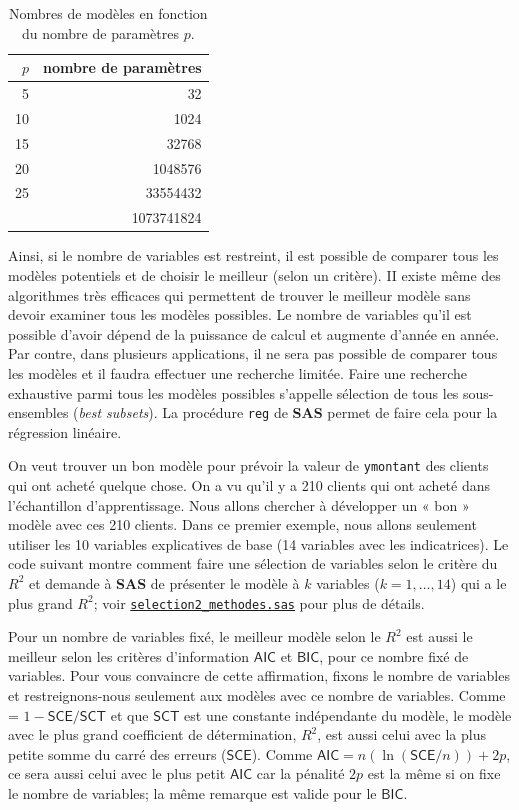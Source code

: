 \documentclass[
  11pt,
  letterpaper,
]{book}
\theoremstyle{definition}
\theoremstyle{definition}
\theoremstyle{definition}
\theoremstyle{definition}
\theoremstyle{remark}
\begin{document}
\begin{table}

\caption{\label{tab:02-table3}Nombres de modèles en fonction du nombre de paramètres $p$.}
\centering
\begin{tabular}[t]{rr}
\toprule
$p$ & nombre de paramètres\\
\midrule
5 & 32\\
10 & 1024\\
15 & 32768\\
20 & 1048576\\
25 & 33554432\\
\addlinespace
30 & 1073741824\\
\bottomrule
\end{tabular}
\end{table}

Ainsi, si le nombre de variables est restreint, il est possible de comparer tous les modèles potentiels et de choisir le meilleur (selon un critère). II existe même des algorithmes très efficaces qui permettent de trouver le meilleur modèle sans devoir examiner tous les modèles possibles. Le nombre de variables qu'il est possible d'avoir dépend de la puissance de calcul et augmente d'année en année. Par contre, dans plusieurs applications, il ne sera pas possible de comparer tous les modèles et il faudra effectuer une recherche limitée. Faire une recherche exhaustive parmi tous les modèles possibles s'appelle sélection de tous les sous-ensembles (\emph{best subsets}). La procédure \texttt{reg} de \textbf{SAS} permet de faire cela pour la régression linéaire.

On veut trouver un bon modèle pour prévoir la valeur de \texttt{ymontant} des clients qui ont acheté quelque chose. On a vu qu'il y a 210 clients qui ont acheté dans l'échantillon d'apprentissage. Nous allons chercher à développer un « bon » modèle avec ces 210 clients. Dans ce premier exemple, nous allons seulement utiliser les 10 variables explicatives de base (14 variables avec les indicatrices). Le code suivant montre comment faire une sélection de variables selon le critère du \(R^2\) et demande à \textbf{SAS} de présenter le modèle à \(k\) variables (\(k=1, \ldots, 14\)) qui a le plus grand \(R^2\); voir \href{https://raw.githubusercontent.com/lbelzile/math60602/master/documents/codeSAS/selection2_methodes.sas}{\texttt{selection2\_methodes.sas}} pour plus de détails.

Pour un nombre de variables fixé, le meilleur modèle selon le \(R^2\) est aussi le meilleur selon les critères d'information \(\mathsf{AIC}\) et \(\mathsf{BIC}\), pour ce nombre fixé de variables. Pour vous convaincre de cette affirmation, fixons le nombre de variables et restreignons-nous seulement aux modèles avec ce nombre de variables. Comme = \(1 - \mathsf{SCE}/\mathsf{SCT}\) et que \(\mathsf{SCT}\) est une constante indépendante du modèle, le modèle avec le plus grand coefficient de détermination, \(R^2\), est aussi celui avec la plus petite somme du carré des erreurs (\(\mathsf{SCE}\)). Comme \(\mathsf{AIC}=n (\ln (\mathsf{SCE}/n)) + 2p\), ce sera aussi celui avec le plus petit \(\mathsf{AIC}\) car la pénalité \(2p\) est la même si on fixe le nombre de variables; la même remarque est valide pour le \(\mathsf{BIC}\).
\end{document}
